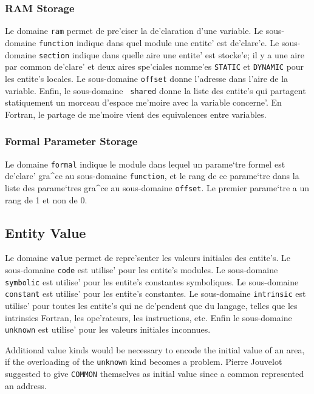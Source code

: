 \subsubsection{RAM Storage}
\label{subsubsection-ram}

{
Le domaine \verb/ram/ permet de pre'ciser la de'claration d'une
variable. Le sous-domaine \verb/function/ indique dans quel module une
entite' est de'clare'e. Le sous-domaine \verb/section/ indique dans
quelle aire une entite' est stocke'e; il y a une aire par common
de'clare' et deux aires spe'ciales nomme'es \verb/STATIC/ et
\verb/DYNAMIC/ pour les entite's locales. Le sous-domaine \verb/offset/
donne l'adresse dans l'aire de la variable. Enfin, le sous-domaine {\tt
shared} donne la liste des entite's qui partagent statiquement un
morceau d'espace me'moire avec la variable concerne'. En Fortran, le
partage de me'moire vient des equivalences entre variables.  }

\subsubsection{Formal Parameter Storage}
\label{subsubsection-formal}

{
Le domaine \verb/formal/ indique le module dans lequel un parame`tre formel
est de'clare' gra^ce au sous-domaine \verb/function/, et le rang de ce
parame`tre dans la liste des parame`tres gra^ce au sous-domaine
\verb/offset/.
Le premier parame`tre a un rang de 1 et non de 0.
}

\subsection{Entity Value}
\label{subsection-value}

{
Le domaine \verb/value/ permet de repre'senter les
valeurs initiales des entite's. Le sous-domaine \verb/code/ est utilise'
pour les entite's modules. Le sous-domaine \verb/symbolic/ est utilise'
pour les entite's constantes symboliques. Le sous-domaine
\verb/constant/ est utilise' pour les entite's constantes. Le
sous-domaine \verb/intrinsic/ est utilise' pour toutes les entite's qui
ne de'pendent que du langage, telles que les intrinsics Fortran, les
ope'rateurs, les instructions, etc. Enfin le sous-domaine
\verb/unknown/ est utilise' pour les valeurs initiales inconnues.

Additional value kinds would be necessary to encode the initial value of
an area, if the overloading of the \verb+unknown+ kind becomes a
problem. Pierre Jouvelot suggested to give \verb+COMMON+ themselves as
initial value since a common represented an address.
}

